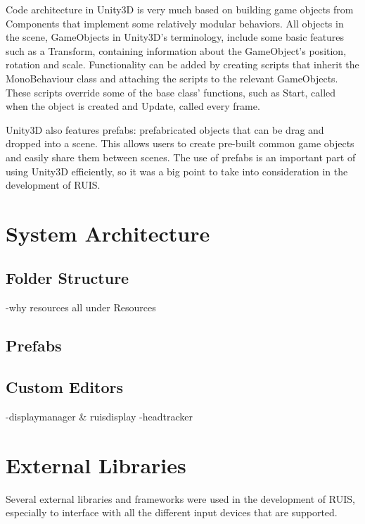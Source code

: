 \documentclass[12pt,a4paper,oneside,pdftex]{report}
\begin{document}
Code architecture in Unity3D is very much based on building game objects from Components that implement some relatively modular behaviors. All objects in the scene, GameObjects in Unity3D's terminology, include some basic features such as a Transform, containing information about the GameObject's position, rotation and scale. Functionality can be added by creating scripts that inherit the MonoBehaviour class and attaching the scripts to the relevant GameObjects. These scripts override some of the base class' functions, such as Start, called when the object is created and Update, called every frame.

Unity3D also features prefabs: prefabricated objects that can be drag and dropped into a scene. This allows users to create pre-built common game objects and easily share them between scenes. The use of prefabs is an important part of using Unity3D efficiently, so it was a big point to take into consideration in the development of RUIS. 

\section{System Architecture}
\label{section:systemarchitecture}

\subsection{Folder Structure}
\label{subsection:systemarchitecture:folderstructure}

-why resources all under Resources

\subsection{Prefabs}
\label{subsection:systemarchitecture:prefabs}



\subsection{Custom Editors}
\label{subsection:systemarchitecture:customeditors}

-displaymanager & ruisdisplay
-headtracker


\section{External Libraries}
\label{section:externallibraries}

Several external libraries and frameworks were used in the development of RUIS, especially to interface with all the different input devices that are supported. 
\end{document}
